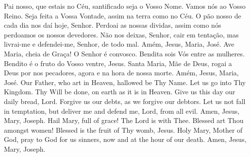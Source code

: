 %

\renewcommand{\thesongnum}{\Roman{songnum}}
\setcounter{songnum}{1}

  \beginverse
    Pai nosso,
    que estais no Céu,
    santificado seja o Vosso Nome.
    Vamos nós ao Vosso Reino.
    Seja feita a Vossa Vontade,
    assim na terra como no Céu.
    O pão nosso de cada dia nos daí hoje, Senhor.
    Perdoai as nossas dividas,
    assim como nós perdoamos os nossos devedores.
    Não nos deixas, Senhor, cair em tentação,
    mas livrai-me e defendei-me, Senhor,
    de todo mal.
    \preceparspace
    Amém, Jesus, Maria, José.
  \endverse
  \beginverse
    Ave Maria,
    cheia de Graça!
    O Senhor é convosco.
    Bendita sois Vós entre as mulheres.
    Bendito é o fruto do Vosso ventre, Jesus.
    Santa Maria, Mãe de Deus,
    rogai a Deus por nos pecadores,
    agora e na hora de nossa morte.
    \preceparspace
    Amém, Jesus, Maria, José.
  \endverse
  \forcebrk\vspace*{\fill}
  \beginverse\color{englishcolor}
    Our Father,
    who art in Heaven,
    hallowed be Thy Name.
    Let us go into Thy Kingdom.
    Thy Will be done,
    on earth as it is in Heaven.
    Give us this day our daily bread, Lord.
    Forgive us our debts,
    as we forgive our debtors.
    Let us not fall in temptation,
    but deliver me and defend me, Lord,
    from all evil.
    \preceparspace
    Amen, Jesus, Mary, Joseph.
  \endverse
  \beginverse\color{englishcolor}
    Hail Mary,
    full of grace!
    The Lord is with Thee.
    Blessed art Thou amongst women!
    Blessed is the fruit of Thy womb, Jesus.
    Holy Mary, Mother of God,
    pray to God for us sinners,
    now and at the hour of our death.
    \preceparspace
    Amen, Jesus, Mary, Joseph.
  \endverse
  \vspace*{\fill}
\endsong


